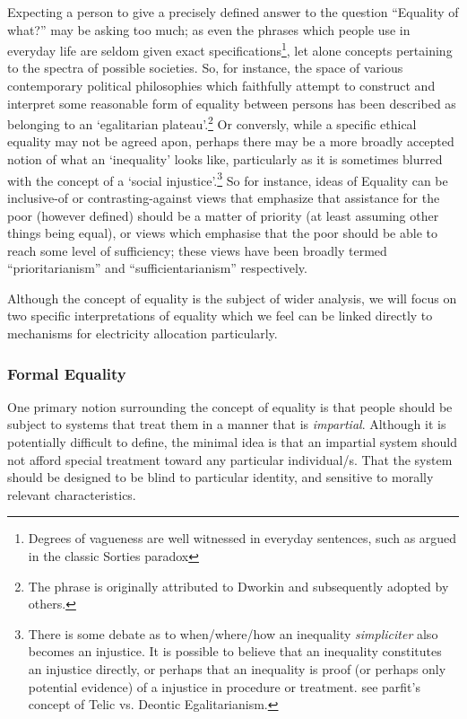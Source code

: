 Expecting a person to give a precisely defined answer to the question ``Equality of what?'' may be asking too much; as even the phrases which people use in everyday life are seldom given exact specifications\footnote{Degrees of vagueness are well witnessed in everyday sentences, such as argued in the classic Sorties paradox\cite{frances_2018}}, let alone concepts pertaining to the spectra of possible societies.
So, for instance, the space of various contemporary political philosophies which faithfully attempt to construct and interpret some reasonable form of equality between persons has been described as belonging to an `egalitarian plateau'.\footnote{The phrase is originally attributed to Dworkin and subsequently adopted by others.}\cite{Brown2007}
Or conversly, while a specific ethical equality may not be agreed apon, perhaps there may be a more broadly accepted notion of what an `inequality' looks like,
particularly as it is sometimes blurred with the concept of a `social injustice'.\footnote{There is some debate as to when/where/how an inequality \textit{simpliciter} also becomes an injustice. It is possible to believe that an inequality constitutes an injustice directly, or perhaps that an inequality is proof (or perhaps only potential evidence) of a injustice in procedure or treatment. see parfit's concept of Telic vs. Deontic Egalitarianism.}
So for instance, ideas of Equality can be inclusive-of or contrasting-against views that emphasize that assistance for the poor (however defined) should be a matter of priority (at least assuming other things being equal), or views which emphasise that the poor should be able to reach some level of sufficiency; these views have been broadly termed ``prioritarianism'' and ``sufficientarianism'' respectively.

Although the concept of equality is the subject of wider analysis, we will focus on two specific interpretations of equality which we feel can be linked directly to mechanisms for electricity allocation particularly.


\subsubsection{Formal Equality}

One primary notion surrounding the concept of equality is that people should be subject to systems that treat them in a manner that is \textit{impartial}. Although it is potentially difficult to define, the minimal idea is that an impartial system should not afford special treatment toward any particular individual/s. That the system should be designed to be blind to particular identity, and sensitive to morally relevant characteristics.

